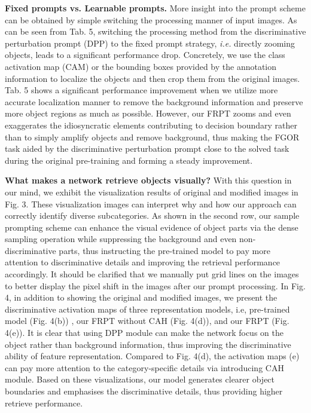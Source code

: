 \documentclass[letterpaper]{article} %
\begin{document}
\textbf{Fixed prompts vs. Learnable prompts.} More insight into the prompt scheme can be obtained by simple switching the processing manner of input images. As can be seen from Tab. 5, switching the processing method from the discriminative perturbation prompt (DPP) to the fixed prompt strategy, \textit{i.e.} directly zooming objects, leads to a significant performance drop.
Concretely, we use the class activation map (CAM) or the bounding boxes provided by the annotation information to localize the objects and then crop them from the original images. Tab. 5 shows a significant performance improvement when we utilize more accurate localization manner to remove the background information and preserve more object regions as much as possible. However, our FRPT zooms and even exaggerates the idiosyncratic elements contributing to decision boundary rather than to simply amplify objects and remove background, thus making the FGOR task aided by the discriminative perturbation prompt close to the solved task during the original pre-training and forming a steady improvement.

\textbf{What makes a network retrieve objects visually?} With this question in our mind, we exhibit the visualization results of original and modified images in Fig. 3. These visualization images can interpret why and how our approach can correctly identify diverse subcategories. As shown in the second row, our sample prompting scheme can enhance the visual evidence of object parts via the dense sampling operation while suppressing the background and even non-discriminative parts, thus instructing the pre-trained model to pay more attention to discriminative details and improving the retrieval performance accordingly.
It should be clarified that we manually put grid lines on the images to better display the pixel shift in the images after our prompt processing. In Fig. 4, in addition to showing the original and modified images, we present the discriminative activation maps of three representation models, i.e, pre-trained model (Fig. 4(b)) , our FRPT without CAH (Fig. 4(d)), and our FRPT (Fig. 4(e)). It is clear that using DPP module can make the network focus on the object rather than background information, thus improving the discriminative ability of feature representation. Compared to Fig. 4(d), the activation maps (e) can pay more attention to the category-specific details via introducing CAH module. Based on these visualizations, our model generates clearer object boundaries and emphasises the discriminative details, thus providing higher retrieve performance.
\end{document}
